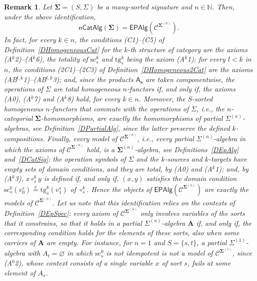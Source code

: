 \documentclass[a4paper, reqno]{amsbook}
\newcommand{\sig}[1]{\mathbf{#1}}             %
\newcommand{\spec}[1]{\boldsymbol{\mathcal{#1}}} %
\newcommand{\eeq}{\overset{\mathrm e}{=}}      %
\newcommand{\src}{\mathrm{sc}}
\newcommand{\tgt}{\mathrm{tg}}
\theoremstyle{plain}
\newtheorem{remark}[theorem]{Remark}
\theoremstyle{definition}
\begin{document}
\begin{remark}\label{RCatAlgAsEpAlg}
Let $\sig{\Sigma}=(S,\Sigma)$ be a many-sorted signature and $n\in\mathbb{N}$.
Then, under the above identification,
$$
\mathsf{nCatAlg}(\sig{\Sigma})=\mathsf{EPAlg}(\spec{C}^{\sig{\Sigma}^{(n)}}).
$$
In fact, for every $k\in n$, the conditions (C1)--(C5) of Definition~\ref{DHomogeneousCat} for the $k$-th structure of category are the axioms (A$^{k}$2)--(A$^{k}$6), the totality of $\src^{k}_{s}$ and $\tgt^{k}_{s}$ being the axiom (A$^{k}$1); for every $l<k$ in $n$, the conditions (2C1)--(2C3) of Definition~\ref{DHomogeneous2Cat} are the axioms (AB$^{l,k}$1)--(AB$^{l,k}$3); and, since the products $\mathsf{A}_{\mathbf{s}}$ are taken componentwise, the operations of $\Sigma$ are total homogeneous $n$-functors if, and only if, the axioms (A0), (A$^{k}$7) and (A$^{k}$8) hold, for every $k\in n$.
Moreover, the $S$-sorted homogeneous $n$-functors that commute with the operations of $\Sigma$, i.e., the $n$-categorial $\sig{\Sigma}$-homomorphisms, are exactly the homomorphisms of partial $\Sigma^{(n)}$-algebras, see Definition~\ref{DPartialAlg}, since the latter preserve the defined $k$-compositions.
Finally, every model of $\spec{C}^{\sig{\Sigma}^{(n)}}$, i.e., every partial $\Sigma^{(n)}$-algebra in which the axioms of $\mathcal{C}^{\sig{\Sigma}^{(n)}}$ hold, is a $\sig{\Sigma}^{(n)}$-algebra, see Definitions~\ref{DEpAlg} and~\ref{DCatSig}: the operation symbols of $\Sigma$ and the $k$-sources and $k$-targets have empty sets of domain conditions, and they are total, by (A0) and (A$^{k}$1); and, by (A$^{k}$3), $x\circ^{k}_{s}y$ is defined if, and only if, $(x,y)$ satisfies the domain condition $\src^{k}_{s}(v^{s}_{0})\eeq\tgt^{k}_{s}(v^{s}_{1})$ of $\circ^{k}_{s}$.
Hence the objects of $\mathsf{EPAlg}(\spec{C}^{\sig{\Sigma}^{(n)}})$ are exactly the models of $\spec{C}^{\sig{\Sigma}^{(n)}}$.
Let us note that this identification relies on the contexts of Definition~\ref{DEpSpec}: every axiom of $\mathcal{C}^{\sig{\Sigma}^{(n)}}$ only involves variables of the sorts that it constrains, so that it holds in a partial $\Sigma^{(n)}$-algebra $\mathbf{A}$ if, and only if, the corresponding condition holds for the elements of these sorts, also when some carriers of $\mathbf{A}$ are empty.
For instance, for $n=1$ and $S=\{s,t\}$, a partial $\Sigma^{(1)}$-algebra with $A_{t}=\varnothing$ in which $\src^{0}_{s}$ is not idempotent is not a model of $\spec{C}^{\sig{\Sigma}^{(1)}}$, since (A$^{0}$2), whose context consists of a single variable $x$ of sort $s$, fails at some element of $A_{s}$.
\end{remark}
\end{document}
